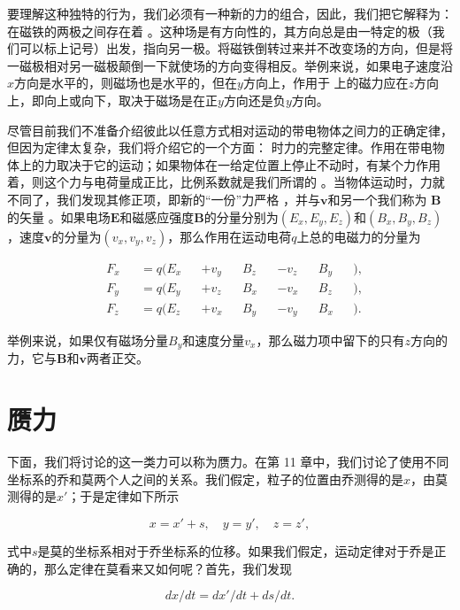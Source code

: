 \documentclass[12pt,oneside]{book}
\providecommand{\FLPvec}[1]{\boldsymbol{#1}}
\providecommand{\FLPB}[0]{\FLPvec{B}}
\providecommand{\FLPE}[0]{\FLPvec{E}}
\providecommand{\FLPv}[0]{\FLPvec{v}}
\begin{document}
要理解这种独特的行为，我们必须有一种新的力的组合，因此，我们把它解释为：在磁铁的两极之间存在着 。这种场是有方向性的，其方向总是由一特定的极（我们可以标上记号）出发，指向另一极。将磁铁倒转过来并不改变场的方向，但是将一磁极相对另一磁极颠倒一下就使场的方向变得相反。举例来说，如果电子速度沿$x$方向是水平的，则磁场也是水平的，但在$y$方向上，作用于  上的磁力应在$z$方向上，即向上或向下，取决于磁场是在正$y$方向还是负$y$方向。


尽管目前我们不准备介绍彼此以任意方式相对运动的带电物体之间力的正确定律，但因为定律太复杂，我们将介绍它的一个方面： 时力的完整定律。作用在带电物体上的力取决于它的运动；如果物体在一给定位置上停止不动时，有某个力作用着，则这个力与电荷量成正比，比例系数就是我们所谓的 。当物体运动时，力就不同了，我们发现其修正项，即新的“一份”力严格 ，并与$\FLPv$和另一个我们称为 $\FLPB$的矢量 。如果电场$\FLPE$和磁感应强度$\FLPB$的分量分别为$(E_x, E_y, E_z)$和$(B_x, B_y, B_z)$，速度$\FLPv$的分量为$(v_x, v_y, v_z)$，那么作用在运动电荷$q$上总的电磁力的分量为


\begin{equation}
\begin{alignedat}{7}
&F_x&&=q(E_x&&+v_y&&B_z&&-v_z&&B_y&&),\\[.5ex]
&F_y&&=q(E_y&&+v_z&&B_x&&-v_x&&B_z&&),\\[.5ex]
&F_z&&=q(E_z&&+v_x&&B_y&&-v_y&&B_x&&).
\end{alignedat}
\label{Eq:I:12:11}
\end{equation}

举例来说，如果仅有磁场分量$B_y$和速度分量$v_x$，那么磁力项中留下的只有$z$方向的力，它与$\FLPB$和$\FLPv$两者正交。


\section{赝力}
下面，我们将讨论的这一类力可以称为赝力。在第 11 章中，我们讨论了使用不同坐标系的乔和莫两个人之间的关系。我们假定，粒子的位置由乔测得的是$x$，由莫测得的是$x'$；于是定律如下所示


\begin{equation*}
x=x'+s,\quad
y=y',\quad
z=z',
\end{equation*}

式中$s$是莫的坐标系相对于乔坐标系的位移。如果我们假定，运动定律对于乔是正确的，那么定律在莫看来又如何呢？首先，我们发现


\begin{equation*}
dx/dt=dx'/dt+ds/dt.
\end{equation*}
\end{document}
